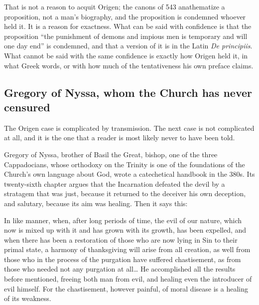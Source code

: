 That is not a reason to acquit Origen; the canons of 543 anathematize a proposition, not a man's biography, and the proposition is condemned whoever held it. It is a reason for exactness. What can be said with confidence is that the proposition ``the punishment of demons and impious men is temporary and will one day end'' is condemned, and that a version of it is in the Latin \emph{De principiis}. What cannot be said with the same confidence is exactly how Origen held it, in what Greek words, or with how much of the tentativeness his own preface claims.

\subsection{Gregory of Nyssa, whom the Church has never censured}

The Origen case is complicated by transmission. The next case is not complicated at all, and it is the one that a reader is most likely never to have been told.

Gregory of Nyssa, brother of Basil the Great, bishop, one of the three Cappadocians, whose orthodoxy on the Trinity is one of the foundations of the Church's own language about God, wrote a catechetical handbook in the 380s. Its twenty-sixth chapter argues that the Incarnation defeated the devil by a stratagem that was just, because it returned to the deceiver his own deception, and salutary, because its aim was healing. Then it says this:

\begin{studyframe}
In like manner, when, after long periods of time, the evil of our nature, which now is mixed up with it and has grown with its growth, has been expelled, and when there has been a restoration of those who are now lying in Sin to their primal state, a harmony of thanksgiving will arise from all creation, as well from those who in the process of the purgation have suffered chastisement, as from those who needed not any purgation at all\ldots{} He accomplished all the results before mentioned, freeing both man from evil, and healing even the introducer of evil himself. For the chastisement, however painful, of moral disease is a healing of its weakness.
\end{studyframe}

